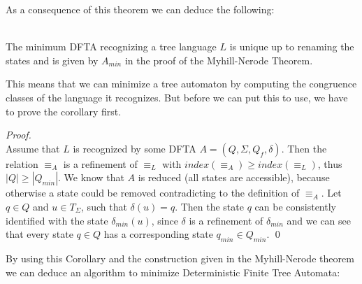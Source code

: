 \documentclass{llncs}
\begin{document}
\newpage

\noindent
As a consequence of this theorem we can deduce the following:

\begin{corollary} \cite{tata-nfta}\\
	The minimum DFTA recognizing a tree language \(L\) is unique up to renaming the states and is given by \(A_{min}\) in the proof of the Myhill-Nerode Theorem.
\end{corollary}

\noindent
This means that we can minimize a tree automaton by computing the congruence classes of the language it recognizes. But before we can put this to use, we have to prove the corollary first.

\begin{proof} {~} \cite{tata-nfta}\\
	Assume that \(L\) is recognized by some DFTA \(A = (Q, \Sigma, Q_f, \delta)\). Then the relation \(\equiv_A\) is a refinement of \(\equiv_L\) with \(index(\equiv_A) \geq index(\equiv_L)\), thus \(|Q| \geq |Q_{min}|\). We know that \(A\) is reduced (all states are accessible), because otherwise a state could be removed contradicting to the definition of \(\equiv_A\). Let \(q \in Q\) and \(u \in T_\Sigma\), such that \(\delta(u) = q\). Then the state \(q\) can be consistently identified with the state \(\delta_{min}(u)\), since \(\delta\) is a refinement of \(\delta_{min}\) and we can see that every state \(q \in Q\) has a corresponding state \(q_{min} \in Q_{min}\).
	\qed
\end{proof}

\noindent
By using this Corollary and the construction given in the Myhill-Nerode theorem we can deduce an algorithm to minimize Deterministic Finite Tree Automata:
\end{document}
